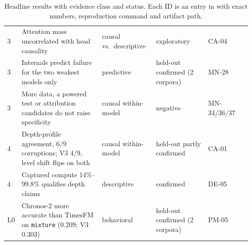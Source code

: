 \begin{table}[tb]
\begin{tabularx}{\textwidth}{@{}l>{\raggedright}Xllll@{}}
3 & Attention mass uncorrelated with head causality & causal vs.\ descriptive & exploratory & CA-04 \\
3 & Internals predict failure for the two weakest models only & predictive & held-out confirmed (2 corpora) & MN-28 \\
3 & More data, a powered test or attribution candidates do not raise specificity & causal within-model & negative & MN-34/36/37 \\
4 & Depth-profile agreement, 6/9 corruptions; V3 4/9, level shift flips on both & causal within-model & held-out partly confirmed & CA-01 \\
4 & Captured compute 14\%--99.8\% qualifies depth claims & descriptive & confirmed & DE-05 \\
\midrule
L0 & Chronos-2 more accurate than TimesFM on \texttt{mixture} (0.209; V3 0.303) & behavioral & held-out confirmed (2 corpora) & PM-05 \\
\bottomrule
\end{tabularx}
\caption{Headline results with evidence class and status. Each ID is an entry in  with exact
numbers, reproduction command and artifact path.}
\label{tab:results}
\end{table}
